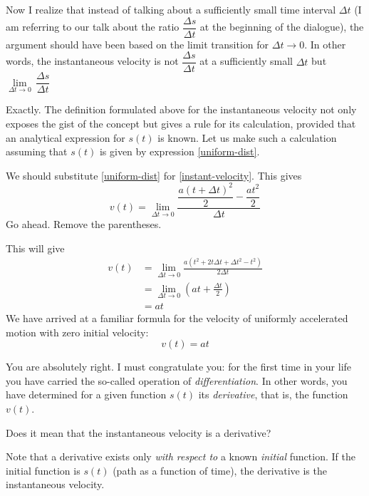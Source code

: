 {\rdr Now I realize that instead of talking about a sufficiently small time interval $\Delta t $ (I am referring to our talk about the ratio $\dfrac{\Delta s }{\Delta t }$ at the beginning of the dialogue), the argument should have been based on the limit transition for $\Delta t \to 0$. In other words, the instantaneous velocity is not $\dfrac{\Delta s }{\Delta t }$  at a sufficiently small  $\Delta t$ but $\lim\limits_{\Delta t \to 0} \, \dfrac{\Delta s }{\Delta t }$ 

\athr Exactly. The definition formulated above for the instantaneous velocity not only exposes the gist of the concept but gives a rule for its calculation, provided that an analytical expression for $s (t)$ is known. Let us make such a calculation assuming that $s(t)$ is given by expression \eqref{uniform-dist}. 

\rdr We should substitute \eqref{uniform-dist} for \eqref{instant-velocity}. This gives
\begin{equation*}%
v(t) =  \lim\limits_{ \Delta t \to 0} \frac{\dfrac{a (t + \Delta t)^{2}}{2} - \dfrac{a t^{2}}{2}}{\Delta t}
\end{equation*}
\athr Go ahead. Remove the parentheses. 

\rdr This will give
\begin{equation*}%
\begin{split}
v(t) & =  \lim\limits_{ \Delta t \to 0} \frac{a (t^{2} + 2t \Delta t + \Delta t^{2} - t^{2})}{2 \Delta t}\\
& = \lim\limits_{ \Delta t \to 0} \left( at + \frac{\Delta t }{2} \right) \\
& = at
\end{split}
\end{equation*}
We have arrived at a familiar formula for the velocity of
uniformly accelerated motion with zero initial velocity:
\begin{equation}%
\boxed{
v(t) = at}
\label{uniform-velocity}
\end{equation}

\athr You are absolutely right. I must congratulate you: for the first time in your life you have carried the so-called operation of \emph{differentiation}. In other words, you have determined for a given function $s (t)$ its \emph{derivative}, that is, the function $v (t)$.

\rdr Does it mean that the instantaneous velocity is a derivative?

\athr Note that a derivative exists only \emph{with respect to} a known \emph{initial} function. If the initial function is $s (t)$ (path as a function of time), the derivative is the instantaneous velocity.

}
